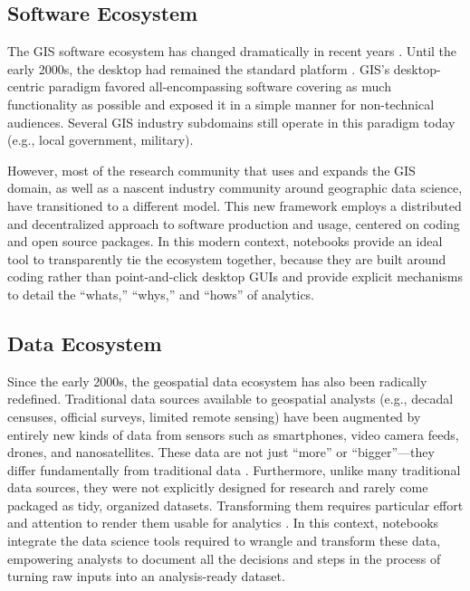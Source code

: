 \documentclass[11pt,letterpaper]{article}
\begin{document}
\subsection{Software Ecosystem}

The GIS software ecosystem has changed dramatically in recent years \citep{arribas-bel_geography_2018}. Until the early 2000s, the desktop had remained the standard platform \citep{gahegan_our_2018}. GIS's desktop-centric paradigm favored all-encompassing software covering as much functionality as possible and exposed it in a simple manner for non-technical audiences. Several GIS industry subdomains still operate in this paradigm today (e.g., local government, military).

However, most of the research community that uses and expands the GIS domain, as well as a nascent industry community around geographic data science, have transitioned to a different model. This new framework employs a distributed and decentralized approach to software production and usage, centered on coding and open source packages. In this modern context, notebooks provide an ideal tool to transparently tie the ecosystem together, because they are built around coding rather than point-and-click desktop GUIs and provide explicit mechanisms to detail the \enquote{whats,} \enquote{whys,} and \enquote{hows} of analytics.

\subsection{Data Ecosystem}

Since the early 2000s, the geospatial data ecosystem has also been radically redefined. Traditional data sources available to geospatial analysts (e.g., decadal censuses, official surveys, limited remote sensing) have been augmented by entirely new kinds of data from sensors such as smartphones, video camera feeds, drones, and nanosatellites. These data are not just \enquote{more} or \enquote{bigger}---they differ fundamentally from traditional data \citep{kitchin_what_2016}. Furthermore, unlike many traditional data sources, they were not explicitly designed for research and rarely come packaged as tidy, organized datasets. Transforming them requires particular effort and attention to render them usable for analytics \citep{harris_more_2017,singleton_geographic_2019}. In this context, notebooks integrate the data science tools required to wrangle and transform these data, empowering analysts to document all the decisions and steps in the process of turning raw inputs into an analysis-ready dataset.
\end{document}

